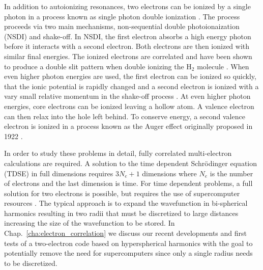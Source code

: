 In addition to autoionizing resonances, two electrons can be ionized by a single photon in a process known as single photon double ionization \cite{maulbetsch1992}. The process proceeds via two main mechanisms, non-sequential double photoionaization (NSDI) and shake-off. In NSDI, the first electron absorbs a high energy photon before it interacts with a second electron. Both electrons are then ionized with similar final energies. The ionized electrons are correlated and have been shown to produce a double slit pattern when double ionizing the H$_2$ molecule \cite{akoury2007}. When even higher photon energies are used, the first electron can be ionized so quickly, that the ionic potential is rapidly  changed and a second electron is ionized with a vary small relative momentum in the shake-off process \cite{carlson1965}.
At even higher photon energies, core electrons can be ionized leaving a hollow atom. A valence electron can then relax into the hole left behind. To conserve energy, a second valence electron is ionized in a process known as the Auger effect originally proposed in 1922 \cite{meitner1922}. 

In order to study these problems in detail, fully correlated multi-electron calculations are required. A solution to the time dependent Schr\"odinger equation (TDSE) in full dimensions requires $3N_e+1$ dimensions where $N_e$ is the number of electrons and the last dimension is time. For time dependent problems, a full solution for two electrons is possible, but requires the use of supercomputer resources \cite{vanroose2006}. The typical approach is to expand the wavefunction in bi-spherical harmonics resulting in two radii that must be discretized to large distances increasing the size of the wavefunction to be stored. In Chap.~\ref{cha:electron_correlation} we discuss our recent developments and first tests of a two-electron code based on hyperspherical harmonics with the goal to potentially remove the need for supercomputers since only a single radius needs to be discretized.

